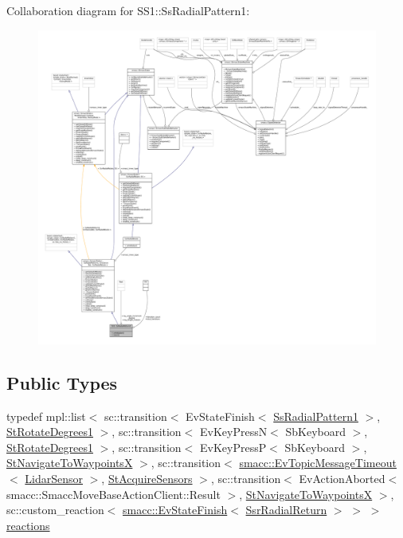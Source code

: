Collaboration diagram for S\+S1\+:\+:Ss\+Radial\+Pattern1\+:
\nopagebreak
\begin{figure}[H]
\begin{center}
\leavevmode
\includegraphics[width=350pt]{structSS1_1_1SsRadialPattern1__coll__graph}
\end{center}
\end{figure}
\subsection*{Public Types}
\begin{DoxyCompactItemize}
\item 
typedef mpl\+::list$<$ sc\+::transition$<$ Ev\+State\+Finish$<$ \hyperlink{structSS1_1_1SsRadialPattern1}{Ss\+Radial\+Pattern1} $>$, \hyperlink{structStRotateDegrees1}{St\+Rotate\+Degrees1} $>$, sc\+::transition$<$ Ev\+Key\+PressN$<$ Sb\+Keyboard $>$, \hyperlink{structStRotateDegrees1}{St\+Rotate\+Degrees1} $>$, sc\+::transition$<$ Ev\+Key\+PressP$<$ Sb\+Keyboard $>$, \hyperlink{structStNavigateToWaypointsX}{St\+Navigate\+To\+WaypointsX} $>$, sc\+::transition$<$ \hyperlink{structsmacc_1_1EvTopicMessageTimeout}{smacc\+::\+Ev\+Topic\+Message\+Timeout}$<$ \hyperlink{sensor__state_8h_a9db9e1944f88de79507758d08e4a2ee3}{Lidar\+Sensor} $>$, \hyperlink{structStAcquireSensors}{St\+Acquire\+Sensors} $>$, sc\+::transition$<$ Ev\+Action\+Aborted$<$ smacc\+::\+Smacc\+Move\+Base\+Action\+Client\+::\+Result $>$, \hyperlink{structStNavigateToWaypointsX}{St\+Navigate\+To\+WaypointsX} $>$, sc\+::custom\+\_\+reaction$<$ \hyperlink{structsmacc_1_1EvStateFinish}{smacc\+::\+Ev\+State\+Finish}$<$ \hyperlink{structSsrRadialReturn}{Ssr\+Radial\+Return} $>$ $>$ $>$ \hyperlink{structSS1_1_1SsRadialPattern1_ad373d8458d49bc064808251bb9dbbc15}{reactions}
\end{DoxyCompactItemize}
